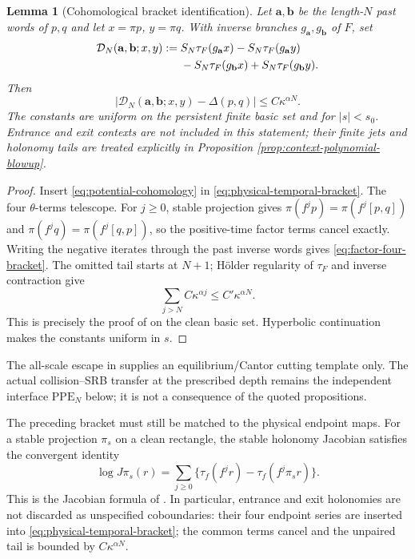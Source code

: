\documentclass[11pt]{article}
\newtheorem{lemma}[theorem]{Lemma}
\begin{document}
\begin{lemma}[Cohomological bracket identification]
\label{lem:cohomological-bracket-identification}
Let $\mathbf a,\mathbf b$ be the length-$N$ past words of $p,q$ and let
$x=\pi p$, $y=\pi q$.  With inverse branches $g_{\mathbf a},g_{\mathbf b}$
of $F$, set
\begin{align}
 \mathcal D_N(\mathbf a,\mathbf b;x,y)
  :={}&S_N\tau_F(g_{\mathbf a}x)-S_N\tau_F(g_{\mathbf a}y)\notag\\
      &-S_N\tau_F(g_{\mathbf b}x)+S_N\tau_F(g_{\mathbf b}y).
\label{eq:factor-four-bracket}
\end{align}
Then
\begin{equation}
\label{eq:bracket-tail}
 |\mathcal D_N(\mathbf a,\mathbf b;x,y)-\Delta(p,q)|
 \le C\kappa^{\alpha N}.
\end{equation}
 The constants are uniform on the persistent finite basic set and for
 $|s|<s_0$.  Entrance and exit contexts are not included in this statement;
 their finite jets and holonomy tails are treated explicitly in Proposition
 \ref{prop:context-polynomial-blowup}.
\end{lemma}

\begin{proof}
Insert \eqref{eq:potential-cohomology} in
\eqref{eq:physical-temporal-bracket}.  The four $\theta$-terms telescope.
For $j\ge0$, stable projection gives
$\pi(f^jp)=\pi(f^j[p,q])$ and
$\pi(f^jq)=\pi(f^j[q,p])$, so the positive-time factor terms cancel
exactly.  Writing the negative iterates through the past inverse words gives
\eqref{eq:factor-four-bracket}.  The omitted tail starts at $N+1$; H\"older
regularity of $\tau_F$ and inverse contraction give
\[
 \sum_{j>N}C\kappa^{\alpha j}\le C'\kappa^{\alpha N}.
\]
 This is precisely the proof of \cite[Lemma~3.15]{Leclerc2026} on the clean
 basic set.  Hyperbolic continuation makes the constants uniform in $s$.
\end{proof}

The all-scale escape in
\cite[Propositions~4.31--4.32]{Leclerc2026} supplies an equilibrium/Cantor
cutting template only.  The actual collision--SRB transfer at the prescribed
depth remains the independent interface $\mathrm{PPE}_{N}$ below; it is not a
consequence of the quoted propositions.

The preceding bracket must still be matched to the physical endpoint maps.
For a stable projection $\pi_s$ on a clean rectangle, the stable holonomy
Jacobian satisfies the convergent identity
\begin{equation}
\label{eq:exact-holonomy-series}
 \log J\pi_s(r)=\sum_{j\ge0}
 \{\tau_f(f^jr)-\tau_f(f^j\pi_s r)\}.
\end{equation}
This is the Jacobian formula of \cite[Lemma~C.1]{Leclerc2026}.  In particular,
entrance and exit holonomies are not discarded as unspecified coboundaries:
their four endpoint series are inserted into \eqref{eq:physical-temporal-bracket};
the common terms cancel and the unpaired tail is bounded by
$C\kappa^{\alpha N}$.
\end{document}

